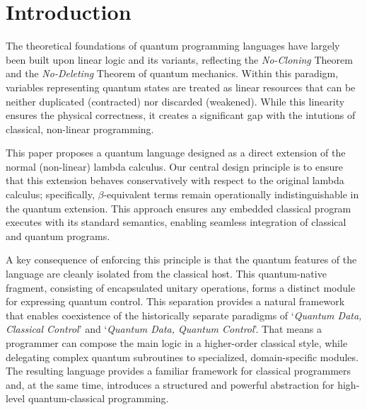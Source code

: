 \section{Introduction} \label{sec:intro}
The theoretical foundations of quantum programming languages have largely been built upon linear logic and its variants\cite{VANTONDER2004_LambdaCalculusQuantum,SELINGER2009_QuantumLambdaCalculus,ALTENKIRCH2005_FunctionalQuantumProgramming,SABRY2018_SymmetricPatternMatchingQuantum,ROSS2017_AlgebraicLogicalMethods}, reflecting the \textit{No-Cloning} Theorem\cite{WOOTTERS1982_SingleQuantumCannota} and the \textit{No-Deleting} Theorem\cite{KUMARPATI2000_ImpossibilityDeletingUnknowna} of quantum mechanics.
Within this paradigm, variables representing quantum states are treated as linear resources that can be neither duplicated (contracted) nor discarded (weakened).
While this linearity ensures the physical correctness, it creates a significant gap with the intutions of classical, non-linear programming.

This paper proposes a quantum language designed as a direct extension of the normal (non-linear) lambda calculus.
Our central design principle is to ensure that this extension behaves conservatively with respect to the original lambda calculus; specifically, $\beta$-equivalent terms remain operationally indistinguishable in the quantum extension.
This approach ensures any embedded classical program executes with its standard semantics, enabling seamless integration of classical and quantum programs.

A key consequence of enforcing this principle is that the quantum features of the language are cleanly isolated from the classical host.
This quantum-native fragment, consisting of encapsulated unitary operations, forms a distinct module for expressing quantum control.
This separation provides a natural framework that enables coexistence of the historically separate paradigms of `\textit{Quantum Data, Classical Control}'\cite{SELINGER2004_QuantumProgrammingLanguage} and `\textit{Quantum Data, Quantum Control}'\cite{DÍAZ-CARO2022_QuickOverviewQuantum}.
That means a programmer can compose the main logic in a higher-order classical style, while delegating complex quantum subroutines to specialized, domain-specific modules.
The resulting language provides a familiar framework for classical programmers and, at the same time, introduces a structured and powerful abstraction for high-level quantum-classical programming.
